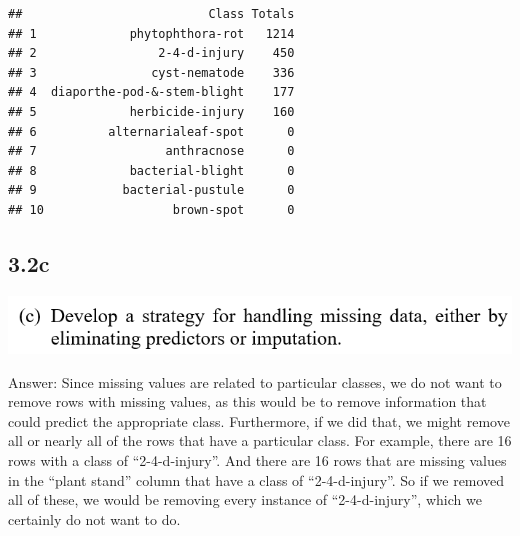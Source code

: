\documentclass[]{book}
\newenvironment{Shaded}{\begin{snugshade}}{\end{snugshade}}
\newcommand{\CommentTok}[1]{\textcolor[rgb]{0.56,0.35,0.01}{\textit{#1}}}
\newcommand{\DataTypeTok}[1]{\textcolor[rgb]{0.13,0.29,0.53}{#1}}
\newcommand{\DecValTok}[1]{\textcolor[rgb]{0.00,0.00,0.81}{#1}}
\newcommand{\KeywordTok}[1]{\textcolor[rgb]{0.13,0.29,0.53}{\textbf{#1}}}
\newcommand{\NormalTok}[1]{#1}
\newcommand{\OperatorTok}[1]{\textcolor[rgb]{0.81,0.36,0.00}{\textbf{#1}}}
\newcommand{\OtherTok}[1]{\textcolor[rgb]{0.56,0.35,0.01}{#1}}
\newcommand{\StringTok}[1]{\textcolor[rgb]{0.31,0.60,0.02}{#1}}
\begin{document}
\begin{Shaded}
\end{Shaded}

\begin{verbatim}
##                          Class Totals
## 1             phytophthora-rot   1214
## 2                 2-4-d-injury    450
## 3                cyst-nematode    336
## 4  diaporthe-pod-&-stem-blight    177
## 5             herbicide-injury    160
## 6          alternarialeaf-spot      0
## 7                  anthracnose      0
## 8             bacterial-blight      0
## 9            bacterial-pustule      0
## 10                  brown-spot      0
\end{verbatim}

\hypertarget{c-5}{%
\subsection{3.2c}\label{c-5}}

\includegraphics{./week3/3.2c.png}

Answer: Since missing values are related to particular classes, we do not want to remove rows with missing values, as this would be to remove information that could predict the appropriate class. Furthermore, if we did that, we might remove all or nearly all of the rows that have a particular class. For example, there are 16 rows with a class of ``2-4-d-injury''. And there are 16 rows that are missing values in the ``plant stand'' column that have a class of ``2-4-d-injury''. So if we removed all of these, we would be removing every instance of ``2-4-d-injury'', which we certainly do not want to do.
\end{document}
